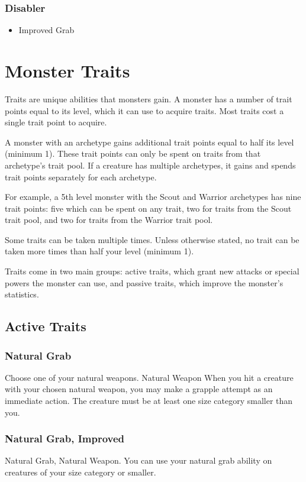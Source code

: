 \subsubsection{Disabler}
\begin{itemize}
    \item Improved Grab
\end{itemize}

\section{Monster Traits}
Traits are unique abilities that monsters gain. A monster has a number of trait points equal to its level, which it can use to acquire traits. Most traits cost a single trait point to acquire.

A monster with an archetype gains additional trait points equal to half its level (minimum 1). These trait points can only be spent on traits from that archetype's trait pool. If a creature has multiple archetypes, it gains and spends trait points separately for each archetype.

For example, a 5th level monster with the Scout and Warrior archetypes has nine trait points: five which can be spent on any trait, two for traits from the Scout trait pool, and two for traits from the Warrior trait pool.

Some traits can be taken multiple times. Unless otherwise stated, no trait can be taken more times than half your level (minimum 1).

Traits come in two main groups: active traits, which grant new attacks or special powers the monster can use, and passive traits, which improve the monster's statistics.

\subsection{Active Traits}

\subsubsection{Natural Grab}
Choose one of your natural weapons.
\featpre Natural Weapon
\featben When you hit a creature with your chosen natural weapon, you may make a grapple attempt as an immediate action. The creature must be at least one size category smaller than you.

\subsubsection{Natural Grab, Improved}
\featpre Natural Grab, Natural Weapon.
\featben You can use your natural grab ability on creatures of your size category or smaller.


